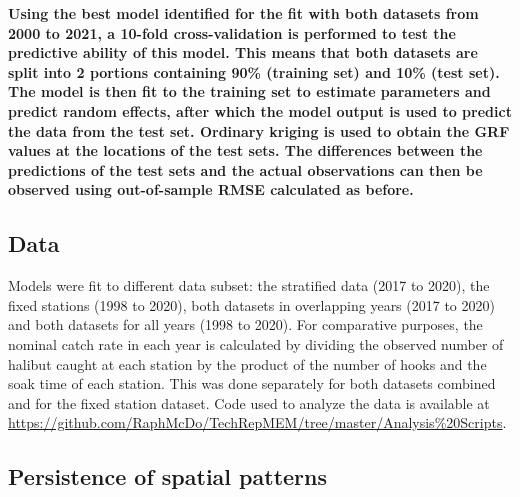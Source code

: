 \documentclass[12pt]{article}\usepackage[]{graphicx}\usepackage[]{color}
\begin{document}
\textbf{Using the best model identified for the fit with both datasets from 2000 to 2021, a 10-fold cross-validation is performed to test the predictive ability of this model. This means that both datasets are split into 2 portions containing 90\% (training set) and 10\% (test set). The model is then fit to the training set to estimate parameters and predict random effects, after which the model output is used to predict the data from the test set. Ordinary kriging is used to obtain the GRF values at the locations of the test sets. The differences between the predictions of the test sets and the actual observations can then be observed using out-of-sample RMSE calculated as before.}

\hypertarget{data}{%
\subsection{Data}\label{data}}

Models were fit to different data subset: the stratified data (2017 to 2020), the fixed stations (1998 to 2020), both datasets in overlapping years (2017 to 2020) and both datasets for all years (1998 to 2020). For comparative purposes, the nominal catch rate in each year is calculated by dividing the observed number of halibut caught at each station by the product of the number of hooks and the soak time of each station. This was done separately for both datasets combined and for the fixed station dataset. Code used to analyze the data is available at \url{https://github.com/RaphMcDo/TechRepMEM/tree/master/Analysis\%20Scripts}.

\hypertarget{persistence-of-spatial-patterns}{%
\subsection{Persistence of spatial patterns}\label{persistence-of-spatial-patterns}}
\end{document}

